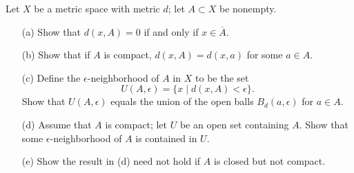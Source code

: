   \begin{exercise}[Munkres 27.2]
    Let $X$ be a metric space with metric $d$; let $A \subset X$ be nonempty.
    \begin{enumerate}
      \item[(a)] Show that $d(x, A) = 0$ if and only if $x \in \overline{A}$.
      \item[(b)] Show that if $A$ is compact, $d(x, A) = d(x, a)$ for some $a \in A$.
      \item[(c)] Define the $\epsilon$-neighborhood of $A$ in $X$ to be the set
        \[
          U(A, \epsilon) = \{x \mid d(x, A) < \epsilon\}.
        \]
        Show that $U(A, \epsilon)$ equals the union of the open balls $B_d(a, \epsilon)$ for $a \in A$.
      \item[(d)] Assume that $A$ is compact; let $U$ be an open set containing $A$. Show that some $\epsilon$-neighborhood of $A$ is contained in $U$.
      \item[(e)] Show the result in (d) need not hold if $A$ is closed but not compact.
    \end{enumerate}
  \end{exercise}
